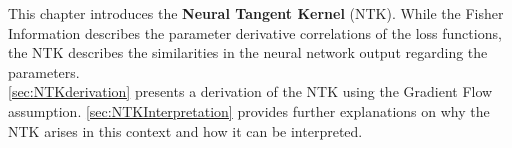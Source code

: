This chapter introduces the \textbf{Neural Tangent Kernel} (NTK). While the Fisher Information describes the parameter derivative correlations of the loss functions, the NTK describes the similarities in the neural network output regarding the parameters.\\
\cref{sec:NTKderivation} presents a derivation of the NTK using the Gradient Flow assumption. \cref{sec:NTKInterpretation} provides further explanations on why the NTK arises in this context and how it can be interpreted.